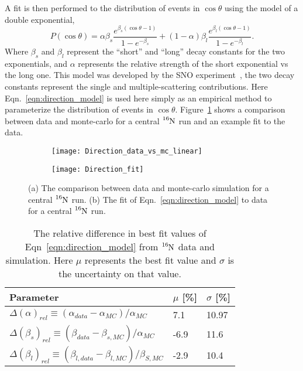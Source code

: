 A fit is then performed to the distribution of events in $\cos\theta$ using
the model of a double exponential,
\begin{equation}
    P(\cos\theta) = \alpha\beta_{s}\frac{e^{\beta_{s}(\cos\theta -1)}}{1-e^{-\beta_{s}}} +
                    (1-\alpha)\beta_{l}\frac{e^{\beta_{l}(\cos\theta - 1)}}{1-e^{-\beta_{l}}}\text{.}
    \label{eqn:direction_model}
\end{equation}
Where $\beta_{s}$ and $\beta_{l}$ represent the ``short'' and ``long'' decay constants
for the two exponentials, and $\alpha$ represents the relative
strength of the short exponential vs the long one.
This model was developed by the SNO experiment~\citep{scott_oser_direction},
the two decay constants represent the single and multiple-scattering
contributions.
Here Eqn.~\eqref{eqn:direction_model} is used here simply as an empirical
method to parameterize the distribution of events in $\cos\theta$.
Figure~\ref{fig:n16_direction} shows a comparison between data and monte-carlo
for a central $\ce{^{16}N}$ run and an example fit to the data.
\begin{figure}[htbp]
    \centering
    \begin{subfigure}{0.48\textwidth}
    \texttt{[image: Direction\_data\_vs\_mc\_linear]}
    \caption[]{}
    \end{subfigure}
    \hfill
    \begin{subfigure}{0.48\textwidth}
    \texttt{[image: Direction\_fit]}
    \end{subfigure}
        \caption[$\ce{^{16}N}$ Direction Reconstruction Comparison]{(a) The
        comparison between data and monte-carlo simulation for a central
        $\ce{^{16}N}$ run. (b) The fit of Eqn.~\eqref{eqn:direction_model}
        to data for a central $\ce{^{16}N}$ run.}
\label{fig:n16_direction}
\end{figure}
\begin{table}
    \centering
    \begin{tabular}{p{7cm}|p{2cm}|p{2cm}}
        \hline
        Parameter & $\mu$ [\%] &  $\sigma$ [\%] \\
        \hline
        \hline
        $\Delta(\alpha)_{rel} \equiv (\alpha_{data} - \alpha_{MC}) / \alpha_{MC}$  & 7.1 & 10.97 \\
        $\Delta(\beta_s)_{rel} \equiv (\beta_{data} - \beta_{s, MC}) / \alpha_{MC}$     & -6.9 & 11.6 \\
        $\Delta(\beta_l)_{rel} \equiv (\beta_{l, data} - \beta_{l, MC}) / \beta_{S, MC}$      & -2.9 & 10.4 \\
        \hline
    \end{tabular}
    \caption[Relative Uncertainties for Direction Reconstruction]{The
    relative difference in best fit values of Eqn~\eqref{eqn:direction_model}
    from $\ce{^{16}N}$ data and simulation. Here $\mu$ represents the
    best fit value and $\sigma$ is the uncertainty on that value.}
    \label{tbl:direction_recon}
\end{table}
